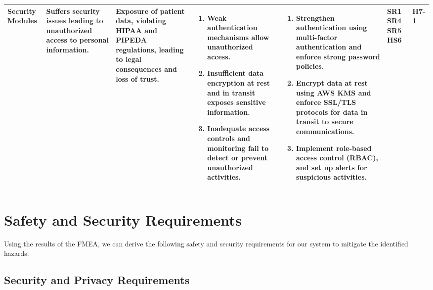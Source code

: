 \documentclass{article}
\begin{document}
\begin{landscape}
\begin{table}[ht]
{\begin{tabular}{|p{2.5cm}|p{2.5cm}|p{3cm}|p{5cm}|p{6cm}|p{1cm}|p{1cm}|}
    Security Modules
     & Suffers security issues leading to unauthorized access to personal information.
     & Exposure of patient data, violating HIPAA and PIPEDA regulations, leading to legal consequences and loss of trust.
     &
     \begin{enumerate}[leftmargin=*, label={\alph*.}, itemsep=1pt]
         \item Weak authentication mechanisms allow unauthorized access.
         \item Insufficient data encryption at rest and in transit exposes sensitive information.
         \item Inadequate access controls and monitoring fail to detect or prevent unauthorized activities.
     \end{enumerate}
     &
     \begin{enumerate}[leftmargin=*, label={\alph*.}, itemsep=1pt]
         \item Strengthen authentication using multi-factor authentication and enforce strong password policies.
         \item Encrypt data at rest using AWS KMS and enforce SSL/TLS protocols for data in transit to secure communications.
         \item Implement role-based access control (RBAC), and set up alerts for suspicious activities.
     \end{enumerate}
     & SR1 \newline SR4 \newline SR5 \newline HS6 & H7-1 \\ \hline

    \end{tabular}
    }
    \end{table}
\end{landscape}







\section{Safety and Security Requirements}

Using the results of the FMEA, we can derive the following safety and security requirements for our system to mitigate the identified hazards.

\subsection{Security and Privacy Requirements}
\end{document}
